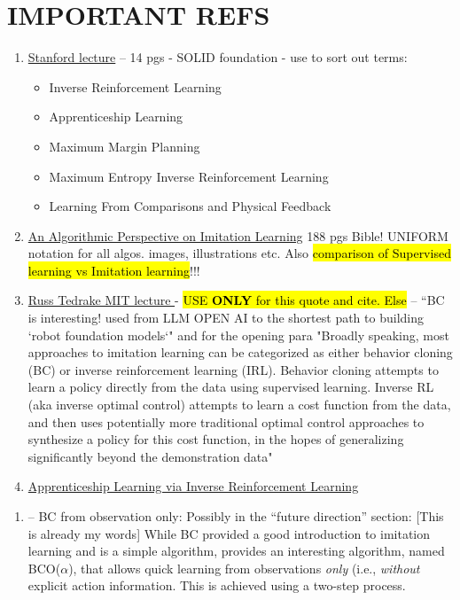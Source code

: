 \documentclass{article}
\newcommand{\hlc}[2][blue!10]{{\colorlet{foo}{#1} \sethlcolor{foo}\hl{#2}}}
\begin{document}
\section{IMPORTANT REFS}
\begin{enumerate}
	\item \href{https://web.stanford.edu/class/cs237b/pdfs/lecture/cs237b_lecture_12.pdf}{Stanford lecture} -- 14 pgs - SOLID foundation - use to sort out terms:
	\begin{itemize}
		\item Inverse Reinforcement Learning  
		\item Apprenticeship Learning 
		\item Maximum Margin Planning
		\item Maximum Entropy Inverse Reinforcement Learning
		\item Learning From Comparisons and Physical Feedback
	\end{itemize}
	\item \cite{Osa-2018} \href{https://arxiv.org/pdf/1811.06711}{An Algorithmic Perspective on Imitation Learning} 188 pgs Bible! UNIFORM notation for all algos. images, illustrations etc. Also \hlc{comparison of Supervised learning vs Imitation learning}!!!
	\item \href{https://underactuated.mit.edu/imitation.html#:~:text=Broadly%20speaking%2C%20most%20approaches%20to,the%20data%20using%20supervised%20learning.}{Russ Tedrake MIT lecture \citep{TedrakeLecture2023}} - \hlc{USE \textbf{ONLY} for this quote and cite. Else } -- ``BC is interesting! used from LLM OPEN AI to the shortest path to building `robot foundation models`"  and for the opening para "Broadly speaking, most approaches to imitation learning can be categorized as either behavior cloning (BC) or inverse reinforcement learning (IRL). Behavior cloning attempts to learn a policy directly from the data using supervised learning. Inverse RL (aka inverse optimal control) attempts to learn a cost function from the data, and then uses potentially more traditional optimal control approaches to synthesize a policy for this cost function, in the hopes of generalizing significantly beyond the demonstration data"
	\item \href{https://ai.stanford.edu/~ang/papers/icml04-apprentice.pdf}{Apprenticeship Learning via Inverse Reinforcement Learning}
\end{enumerate}
\begin{enumerate}
	\item \cite{torabi2018BCO} -- BC from observation only: Possibly in the ``future direction'' section: [This is already my words] While BC provided a good introduction to imitation learning and is a simple algorithm, \cite{torabi2018BCO} provides an interesting algorithm, named BCO($\alpha$), that allows quick learning from observations \textit{only} (i.e., \textit{without} explicit action information. This is achieved using a two-step process.
\end{enumerate}
\end{document}
